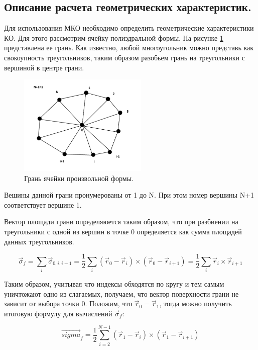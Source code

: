 \subsection{Описание расчета геометрических характеристик.}

Для использования МКО необходимо определить геометрические характеристики КО. Для этого рассмотрим ячейку полиэдральной формы. На рисунке \ref{fig:3} представлена ее грань. Как известно, любой многоугольник можно представь как свокоупность треугольников, таким образом разобьем грань на треугольники с вершиной в центре грани.


\begin{figure}[H]
    \centering
    \includegraphics[width=0.55\textwidth]{img/3.png}
    \caption{Грань ячейки произвольной формы.}
    \label{fig:3}
\end{figure}

Вешины данной грани пронумерованы от 1 до N. При этом номер вершины N+1 соответствует вершине 1.

Вектор площади грани определяюется таким образом, что при разбиении на треугольники с одной из вершин в точке 0 определяется как сумма площадей данных треугольников.

\begin{equation}
    \vec{\sigma}_f=\sum_i\vec{\sigma}_{0,i,i+1} = \frac{1}{2}\sum_i(\vec{r}_0-\vec{r}_i)\times (\vec{r}_0-\vec{r}_{i+1}) = \frac{1}{2}\sum_i\vec{r}_i\times\vec{r}_{i+1}
\end{equation}

Таким образом, учитывая что индексы обходятся по кругу и тем самым уничтожают одно из слагаемых, получаем, что вектор поверхности грани не зависит от выбора точки 0. Положим, что $\vec{r}_0=\vec{r}_1$, тогда можно получить итоговую формулу для вычислений $\vec{\sigma}_f$:

\begin{equation}
    \vec{sigma}_f = \frac{1}{2}\sum_{i=2}^{N-1} (\vec{r}_1-\vec{r}_i)\times (\vec{r}_1-\vec{r}_{i+1})
\end{equation}



